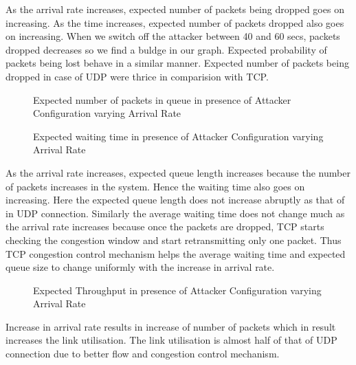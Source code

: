 As the arrival rate increases, expected number of packets being dropped goes on increasing. As the time increases, expected number of packets dropped also goes on increasing. When we switch off the attacker between 40 and 60 secs, packets dropped decreases so we find a buldge in our graph. Expected probability of packets being lost behave in a similar manner. Expected number of packets being dropped in case of UDP were thrice in comparision with TCP.

\begin{figure}[H]
		\centering
		\caption{{Expected number of packets in queue in presence of Attacker Configuration varying Arrival Rate}}
		\label{fig:figbd1}
\end{figure}

\begin{figure}[H]
		\centering
		\caption{{Expected waiting time in presence of Attacker Configuration varying Arrival Rate}}
		\label{fig:figbe1}
\end{figure}

As the arrival rate increases, expected queue length increases because the number of packets increases in the system. Hence the waiting time also goes on increasing. Here the expected queue length does not increase abruptly as that of in UDP connection. Similarly the average waiting time does not change much as the arrival rate increases because once the packets are dropped, TCP starts checking the congestion window and start retransmitting only one packet. Thus TCP congestion control mechanism helps the average waiting time and expected queue size to change uniformly with the increase in arrival rate. 


\begin{figure}[H]
		\centering
		\caption{{Expected Throughput in presence of Attacker Configuration varying Arrival Rate}}
		\label{fig:figbf1}
\end{figure}

Increase in arrival rate results in increase of number of packets which in result increases the link utilisation. The link utilisation is almost half of that of UDP connection due to better flow and congestion control mechanism.

\pagebreak

